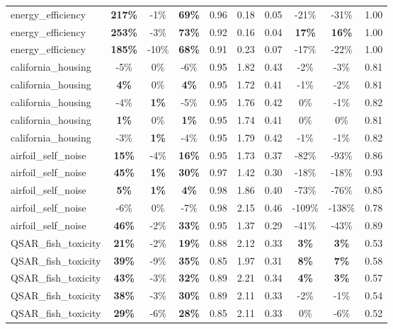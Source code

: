 \begin{table}[!htbp]
\begin{small}
\begin{sc}
{\begin{tabular}{lccccccccc}
energy\_efficiency & \textbf{217\%} & -1\% & \textbf{69\%} & 0.96 & 0.18 & 0.05 & -21\% & -31\% & 1.00 \\
energy\_efficiency & \textbf{253\%} & -3\% & \textbf{73\%} & 0.92 & 0.16 & 0.04 & \textbf{17\%} & \textbf{16\%} & 1.00 \\
energy\_efficiency & \textbf{185\%} & -10\% & \textbf{68\%} & 0.91 & 0.23 & 0.07 & -17\% & -22\% & 1.00 \\
california\_housing & -5\% & 0\% & -6\% & 0.95 & 1.82 & 0.43 & -2\% & -3\% & 0.81 \\
california\_housing & \textbf{4\%} & 0\% & \textbf{4\%} & 0.95 & 1.72 & 0.41 & -1\% & -2\% & 0.81 \\
california\_housing & -4\% & \textbf{1\%} & -5\% & 0.95 & 1.76 & 0.42 & 0\% & -1\% & 0.82 \\
california\_housing & \textbf{1\%} & 0\% & \textbf{1\%} & 0.95 & 1.74 & 0.41 & 0\% & 0\% & 0.81 \\
california\_housing & -3\% & \textbf{1\%} & -4\% & 0.95 & 1.79 & 0.42 & -1\% & -1\% & 0.82 \\
airfoil\_self\_noise & \textbf{15\%} & -4\% & \textbf{16\%} & 0.95 & 1.73 & 0.37 & -82\% & -93\% & 0.86 \\
airfoil\_self\_noise & \textbf{45\%} & \textbf{1\%} & \textbf{30\%} & 0.97 & 1.42 & 0.30 & -18\% & -18\% & 0.93 \\
airfoil\_self\_noise & \textbf{5\%} & \textbf{1\%} & \textbf{4\%} & 0.98 & 1.86 & 0.40 & -73\% & -76\% & 0.85 \\
airfoil\_self\_noise & -6\% & 0\% & -7\% & 0.98 & 2.15 & 0.46 & -109\% & -138\% & 0.78 \\
airfoil\_self\_noise & \textbf{46\%} & -2\% & \textbf{33\%} & 0.95 & 1.37 & 0.29 & -41\% & -43\% & 0.89 \\
QSAR\_fish\_toxicity & \textbf{21\%} & -2\% & \textbf{19\%} & 0.88 & 2.12 & 0.33 & \textbf{3\%} & \textbf{3\%} & 0.53 \\
QSAR\_fish\_toxicity & \textbf{39\%} & -9\% & \textbf{35\%} & 0.85 & 1.97 & 0.31 & \textbf{8\%} & \textbf{7\%} & 0.58 \\
QSAR\_fish\_toxicity & \textbf{43\%} & -3\% & \textbf{32\%} & 0.89 & 2.21 & 0.34 & \textbf{4\%} & \textbf{3\%} & 0.57 \\
QSAR\_fish\_toxicity & \textbf{38\%} & -3\% & \textbf{30\%} & 0.89 & 2.11 & 0.33 & -2\% & -1\% & 0.54 \\
QSAR\_fish\_toxicity & \textbf{29\%} & -6\% & \textbf{28\%} & 0.85 & 2.11 & 0.33 & 0\% & -6\% & 0.52 \\
\bottomrule
\end{tabular}
}
\end{sc}
\end{small}
\end{table}
